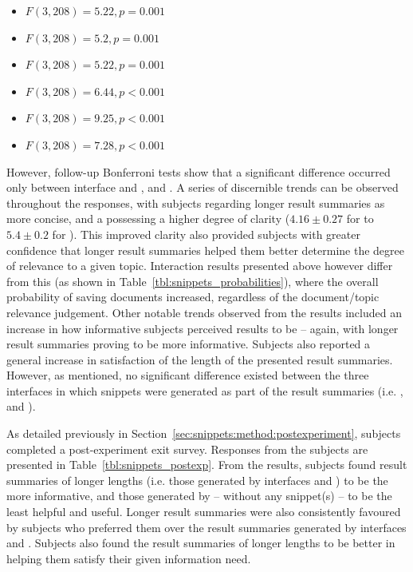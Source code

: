\begin{itemize}
    \item{ $F(3,208)=5.22, p=0.001$}
    \item{ $F(3,208)=5.2, p=0.001$}
    \item{ $F(3,208)=5.22, p=0.001$}
    \item{ $F(3,208)=6.44, p<0.001$}
    \item{ $F(3,208)=9.25, p<0.001$}
    \item{ $F(3,208)=7.28, p<0.001$}
\end{itemize}

However, follow-up Bonferroni tests show that a significant difference occurred only between interface  and ,  and . A series of discernible trends can be observed throughout the responses, with subjects regarding longer result summaries as more concise, and a possessing a higher degree of clarity ($4.16\pm0.27$ for  to $5.4\pm0.2$ for ). This improved clarity also provided subjects with greater confidence that longer result summaries helped them better determine the degree of relevance to a given topic. Interaction results presented above however differ from this (as shown in Table~\ref{tbl:snippets_probabilities}), where the overall probability of saving documents increased, regardless of the document/topic relevance judgement. Other notable trends observed from the results included an increase in how informative subjects perceived results to be -- again, with longer result summaries proving to be more informative. Subjects also reported a general increase in satisfaction of the length of the presented result summaries. However, as mentioned, no significant difference existed between the three interfaces in which snippets were generated as part of the result summaries (i.e. ,  and ).

As detailed previously in Section~\ref{sec:snippets:method:postexperiment}, subjects completed a post-experiment exit survey. Responses from the subjects are presented in Table~\ref{tbl:snippets_postexp}. From the results, subjects found result summaries of longer lengths (i.e. those generated by interfaces  and ) to be the more informative, and those generated by  -- without any snippet(s) -- to be the least helpful and useful. Longer result summaries were also consistently favoured by subjects who preferred them over the result summaries generated by interfaces  and . Subjects also found the result summaries of longer lengths to be better in helping them satisfy their given information need.

